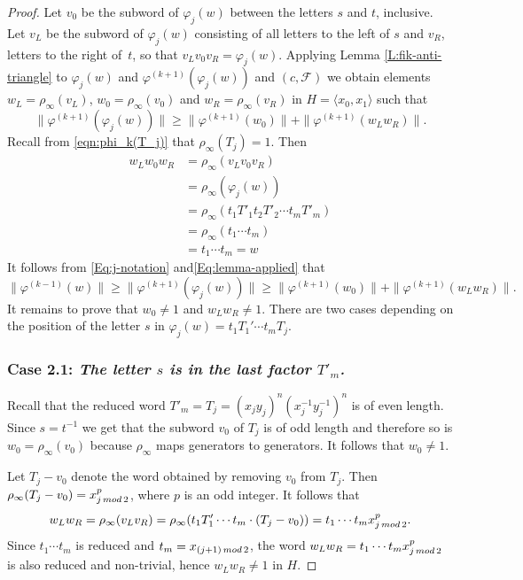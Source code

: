 \documentclass[10pt,a4paper]{amsart}
\newcommand{\C}[1]{{\mathscr #1}}
\begin{document}
\begin{proof}
Let $v_0$ be the subword of $\varphi_{j}(w)$ between the letters 
$s$ and $t$, inclusive.
Let $v_L$ be the subword of $\varphi_{j}(w)$ consisting of all letters to the left of
$s$ and $v_R$, letters to the right of~$t$, so that $v_Lv_0v_R=\varphi_{j}(w)$.
Applying Lemma \ref{L:fik-anti-triangle} to $\varphi_j(w)$ and $\varphi^{(k+1)}(\varphi_j(w))$
and $(c,\C F)$ we obtain elements $w_L=\rho_{\infty}(v_L)$, $w_0=\rho_{\infty}(v_0)$ and
$w_R=\rho_{\infty}(v_R)$ in $H = \langle x_0,x_1 \rangle$ such that
\begin{equation}
\|\varphi^{(k+1)}(\varphi_{j}(w))\|
\geq \|\varphi^{(k+1)}(w_0)\|+ \|\varphi^{(k+1)}(w_Lw_R)\|.
\label{Eq:lemma-applied}
\end{equation}
Recall from \eqref{eqn:phi_k(T_j)} that $\rho_{\infty}(T_j) = 1$.
Then
\begin{align*}
w_Lw_0w_R &= \rho_{\infty}(v_Lv_0v_R)\\ 
&= \rho_{\infty}(\varphi_{j}(w))\\
&=\rho_{\infty}(t_1 T'_1 t_2 T'_2\cdots t_mT'_{m})\\
&=\rho_{\infty}(t_1\cdots t_m)\\
&=t_1\cdots t_m=w
\end{align*}
It follows from
\eqref{Eq:j-notation} and\eqref{Eq:lemma-applied} that
$$
\|\varphi^{(k-1)}(w)\| \geq
\|\varphi^{(k+1)}(\varphi_{j}(w))\|
\geq \|\varphi^{(k+1)}(w_0)\|+ \|\varphi^{(k+1)}(w_Lw_R)\|.
$$
It remains to prove that $w_0\neq 1$ and $w_Lw_R\neq 1$.
There are two cases depending on the position of the letter $s$ in
$\varphi_{j}(w) = t_1T_1' \cdots t_mT_j$.

\subsubsection*{Case 2.1: {\it The letter $s$ is in the last factor $T'_m$.}}

Recall that the reduced word $T'_m=T_j = (x_jy_j)^n(x_j^{-1}y_j^{-1})^n$
is of even length. Since $s=t^{-1}$ we
get that the subword $v_0$ of $T_j$ is of odd length and therefore so is 
$w_0=\rho_{\infty}(v_0)$ because $\rho_{\infty}$ maps generators to 
generators. 
It follows that $w_0 \neq 1$.

Let $T_j- v_0$ denote the word obtained by removing $v_0$ from $T_j$.
Then
$\rho_{\infty}(T_j- v_0) = x_{j\,{\rm mod}\,2}^p$, where $p$ is an odd integer. 
It follows that
$$
w_Lw_R = \rho_{\infty}(v_Lv_R) = \rho_{\infty}(t_1T_1'\cdots t_m \cdot (T_j-v_0))
=t_1\cdots t_m x_{j\,{\rm mod}\,2}^p.
$$
Since $t_1\cdots t_m$ is reduced and $t_m=x_{(j+1)\,{\rm mod}\,2}$, the word 
$w_Lw_R=t_1\cdots t_m x_{j\,{\rm mod}\,2}^p$ is also reduced and non-trivial,
hence $w_Lw_R\neq 1$ in $H$.


\end{proof}
\end{document}
